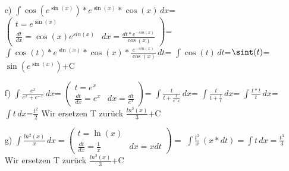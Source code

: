 \documentclass{standalone}
\begin{document}
\begin{itemize}
    \item[e)]
    $\int \cos(e^{\sin(x)})*e^{\sin(x)}*\cos(x)\,dx$=
    $\begin{pmatrix}
        t = e^{\sin(x)} &  \\
        \frac{dt}{dx} = \cos(x)e^{sin(x)} & dx = \frac{dt*e^{-sin(x)}}{\cos(x)}
    \end{pmatrix}$=
    $\int \cos(t)*e^{\sin(x)}*\cos(x)*\frac{e^{-sin(x)}}{\cos(x)}\,dt$= 
    $\int \cos(t)\,dt$=$\sint(t)$=$\sin(e^{\sin(x)})$+C

    \item[f)]
    $\int \frac{e^x}{e^x+e^{-x}}\,dx$=
    $\begin{pmatrix}
        t = e^x &  \\
        \frac{dt}{dx} = e^x & dx = \frac{dt}{e^x}  
    \end{pmatrix}$=
    $\int \frac{t}{t+\frac{1}{e^-x}}\,dx$=
    $\int \frac{t}{t+\frac{1}{t}}\,dx$=
    $\int \frac{t*t}{t}\,dx$=$\int t \,dx$=$\frac{t^2}{2}$ Wir ersetzen T zurück\rightarrow
    $\frac{ln^3(x)}{3}$+C


    \item[g)]   
    $\int \frac{ln^2(x)}{x}\,dx=
    \begin{pmatrix}
        t = \ln(x) &  \\
        \frac{dt}{dx} = \frac{1}{x} & dx = xdt  
    \end{pmatrix}=$
    $\int \frac{t^2}{x}\,(x*dt)=\int t\,dx=\frac{t^3}{3}$ Wir ersetzen T zurück\rightarrow
    $\frac{ln^3(x)}{3}$+C

\end{itemize}
\end{document}

